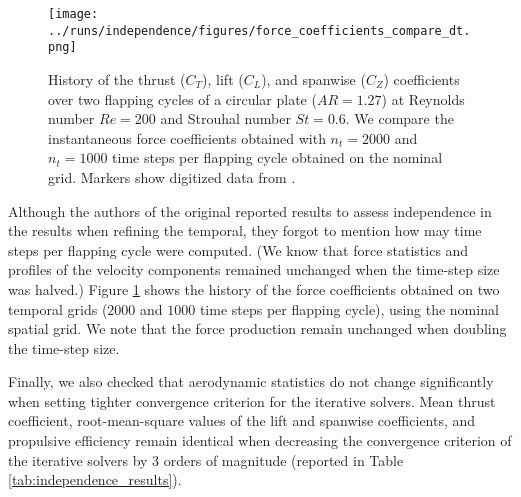 \begin{figure}
  \centering
  \texttt{[image: ../runs/independence/figures/force\_coefficients\_compare\_dt.png]}
  \caption{History of the thrust ($C_T$), lift ($C_L$), and spanwise ($C_Z$) coefficients over two flapping cycles of a circular plate ($AR = 1.27$) at Reynolds number $Re = 200$ and Strouhal number $St = 0.6$. We compare the instantaneous force coefficients obtained with $n_t = 2000$ and $n_t = 1000$ time steps per flapping cycle obtained on the nominal grid. Markers show digitized data from \citet{li_dong_2016}.}
  \label{fig:independence_force_coefficients_dt}
\end{figure}

Although the authors of the original reported results to assess independence in the results when refining the temporal, they forgot to mention how may time steps per flapping cycle were computed.
(We know that force statistics and profiles of the velocity components remained unchanged when the time-step size was halved.)
Figure \ref{fig:independence_force_coefficients_dt} shows the history of the force coefficients obtained on two temporal grids ($2000$ and $1000$ time steps per flapping cycle), using the nominal spatial grid.
We note that the force production remain unchanged when doubling the time-step size.

Finally, we also checked that aerodynamic statistics do not change significantly when setting tighter convergence criterion for the iterative solvers.
Mean thrust coefficient, root-mean-square values of the lift and spanwise coefficients, and propulsive efficiency remain identical when decreasing the convergence criterion of the iterative solvers by 3 orders of magnitude (reported in Table \ref{tab:independence_results}).

